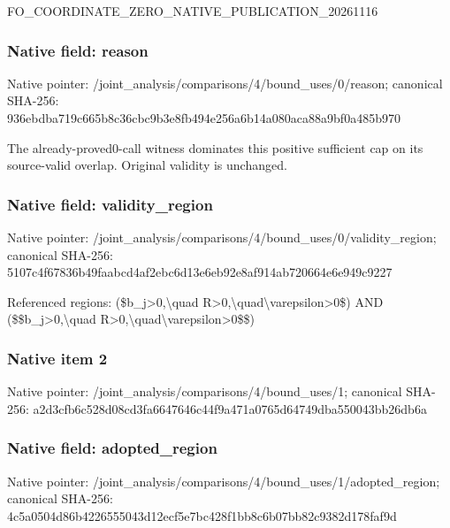 \documentclass[10pt,a4paper]{article}
\begin{document}
\begingroup\raggedright\sloppy FO\_\allowbreak{}COORDINATE\_\allowbreak{}ZERO\_\allowbreak{}NATIVE\_\allowbreak{}PUBLICATION\_\allowbreak{}20261116\par\endgroup

\subsubsection{Native field: reason}
Native pointer: /joint\_\allowbreak{}analysis/comparisons/4/bound\_\allowbreak{}uses/0/reason; canonical SHA-256: 936ebdba719c665b8c36cbc9b3e8fb494e256a6b14a080aca88a9bf0a485b970

\begingroup\raggedright\sloppy The already-proved0-call witness dominates this positive sufficient cap on its source-valid overlap. Original validity is unchanged.\par\endgroup

\subsubsection{Native field: validity\_\allowbreak{}region}
Native pointer: /joint\_\allowbreak{}analysis/comparisons/4/bound\_\allowbreak{}uses/0/validity\_\allowbreak{}region; canonical SHA-256: 5107c4f67836b49faabcd4af2ebc6d13e6eb92e8af914ab720664e6e949c9227

\begingroup\raggedright\sloppy Referenced regions:\allowbreak{} (\$b\_\allowbreak{}j>0,\allowbreak{}\textbackslash{}quad R>0,\allowbreak{}\textbackslash{}quad\textbackslash{}varepsilon>0\$) AND (\$\$b\_\allowbreak{}j>0,\allowbreak{}\textbackslash{}quad R>0,\allowbreak{}\textbackslash{}quad\textbackslash{}varepsilon>0\$\$)\par\endgroup

\subsubsection{Native item 2}
Native pointer: /joint\_\allowbreak{}analysis/comparisons/4/bound\_\allowbreak{}uses/1; canonical SHA-256: a2d3cfb6c528d08cd3fa6647646c44f9a471a0765d64749dba550043bb26db6a

\subsubsection{Native field: adopted\_\allowbreak{}region}
Native pointer: /joint\_\allowbreak{}analysis/comparisons/4/bound\_\allowbreak{}uses/1/adopted\_\allowbreak{}region; canonical SHA-256: 4c5a0504d86b4226555043d12ecf5e7bc428f1bb8c6b07bb82c9382d178faf9d
\end{document}

